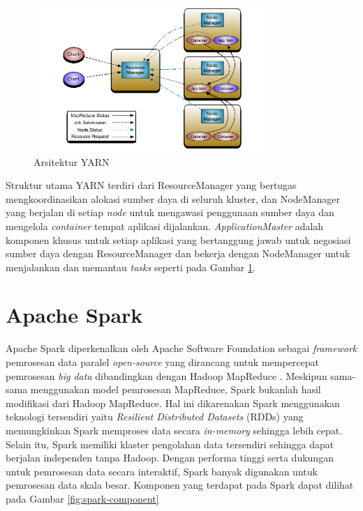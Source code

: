 \begin{figure}[h!]
    \centering
    \includegraphics[width=0.8\textwidth]{figures/ch02/yarn-arch}
    \caption{Arsitektur YARN \cite{ApacheHadoopApache}}
    \label{fig:yarn_arch}
\end{figure}

Struktur utama YARN terdiri dari ResourceManager yang bertugas mengkoordinasikan alokasi sumber daya di seluruh kluster, dan NodeManager yang berjalan di setiap \textit{node} untuk mengawasi penggunaan sumber daya dan mengelola \textit{container} tempat aplikasi dijalankan. \textit{ApplicationMaster} adalah komponen khusus untuk setiap aplikasi yang bertanggung jawab untuk negosiasi sumber daya dengan ResourceManager dan bekerja dengan NodeManager untuk menjalankan dan memantau \textit{tasks} seperti pada Gambar \ref{fig:yarn_arch}.

\section{Apache Spark}
Apache Spark diperkenalkan oleh Apache Software Foundation sebagai \textit{framework} pemrosesan data paralel \textit{open-source} yang dirancang untuk mempercepat pemrosesan \textit{big data} dibandingkan dengan  Hadoop MapReduce \cite{ApacheSparkUnified}. Meskipun sama-sama menggunakan model pemrosesan MapReduce, Spark bukanlah hasil modifikasi dari Hadoop MapReduce\cite{KOMPARASIKECEPATANHADOOP}. Hal ini dikarenakan Spark menggunakan teknologi tersendiri yaitu \textit{Resilient Distributed Datasets} (RDDs) yang memungkinkan Spark memproses data secara \textit{in-memory} sehingga lebih cepat. Selain itu, Spark memiliki klaster pengolahan data tersendiri sehingga dapat berjalan independen tanpa Hadoop. Dengan performa tinggi serta dukungan untuk pemrosesan data secara interaktif, Spark banyak digunakan untuk pemrosesan data skala besar. Komponen yang terdapat pada Spark dapat dilihat pada Gambar \ref{fig:spark-component}

